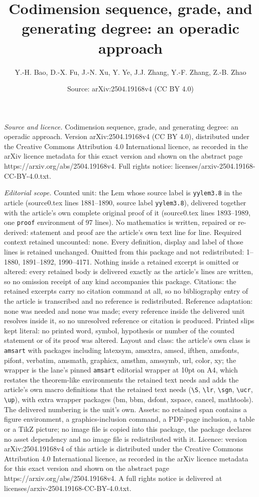 \documentclass[10pt,a4paper]{amsart}
\title[Codimension sequence, grade, and generating degree: an opera]{Codimension sequence, grade, and generating degree: an operadic approach}
\author{Y.-H. Bao, D.-X. Fu, J.-N. Xu, Y. Ye, J.J. Zhang, Y.-F. Zhang, Z.-B. Zhao}
\date{Source: arXiv:2504.19168v4 (CC BY 4.0)}
\begin{document}
\maketitle

\noindent\emph{Source and licence.} Codimension sequence, grade, and generating degree: an operadic approach. Version arXiv:2504.19168v4 (CC BY 4.0), distributed under the Creative Commons Attribution 4.0 International licence, as recorded in the arXiv licence metadata for this exact version and shown on the abstract page https://arxiv.org/abs/2504.19168v4. Full rights notice: licenses/arxiv-2504.19168-CC-BY-4.0.txt.\par\smallskip

\noindent\textit{Editorial scope.} Counted unit: the Lem whose source label is \texttt{yylem3.8} in the article (source0.tex lines 1881--1890, source label \texttt{yylem3.8}), delivered together with the article's own complete original proof of it (source0.tex lines 1893--1989, one \texttt{proof} environment of 97 lines). No mathematics is written, repaired or re-derived: statement and proof are the article's own text line for line. Required context retained uncounted: none. Every definition, display and label of those lines is retained unchanged. Omitted from this package and not redistributed: 1--1880, 1891--1892, 1990--4171. Nothing inside a retained excerpt is omitted or altered: every retained body is delivered exactly as the article's lines are written, so no omission receipt of any kind accompanies this package. Citations: the retained excerpts carry no citation command at all, so no bibliography entry of the article is transcribed and no reference is redistributed. Reference adaptation: none was needed and none was made; every reference inside the delivered unit resolves inside it, so no unresolved reference or citation is produced. Printed slips kept literal: no printed word, symbol, hypothesis or number of the counted statement or of its proof was altered. Layout and class: the article's own class is \texttt{amsart} with packages including latexsym, amsxtra, amscd, ifthen, amsfonts, pifont, verbatim, amsmath, graphicx, amsthm, amssymb, url, color, xy; the wrapper is the lane's pinned \texttt{amsart} editorial wrapper at 10pt on A4, which restates the theorem-like environments the retained text needs and adds the article's own macro definitions that the retained text needs (\texttt{\textbackslash S}, \texttt{\textbackslash lr}, \texttt{\textbackslash sgn}, \texttt{\textbackslash ucr}, \texttt{\textbackslash up}), with extra wrapper packages (bm, bbm, dsfont, xspace, cancel, mathtools). The delivered numbering is the unit's own. Assets: no retained span contains a figure environment, a graphics-inclusion command, a PDF-page inclusion, a table or a TikZ picture; no image file is copied into this package, the package declares no asset dependency and no image file is redistributed with it. Licence: version arXiv:2504.19168v4 of this article is distributed under the Creative Commons Attribution 4.0 International licence, as recorded in the arXiv licence metadata for this exact version and shown on the abstract page https://arxiv.org/abs/2504.19168v4. A full rights notice is delivered at licenses/arxiv-2504.19168-CC-BY-4.0.txt. 
\end{document}
